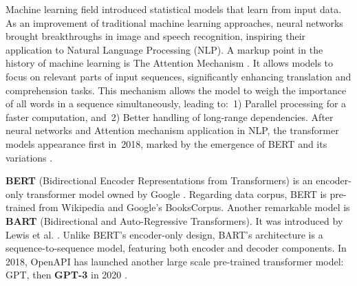 Machine learning field introduced statistical models that learn from input data. As an improvement of traditional machine learning approaches, neural networks brought breakthroughs in image and speech recognition, inspiring their application to Natural Language Processing (NLP). A markup point in the history of machine learning is The Attention Mechanism \cite{10.5555/3295222.3295349}. It allows models to focus on relevant parts of input sequences, significantly enhancing translation and comprehension tasks.
This mechanism allows the model to weigh the importance of all words in a sequence simultaneously, leading to:~1) Parallel processing for a faster computation, and~2) Better handling of long-range dependencies. After neural networks and Attention mechanism application in NLP, the transformer models appearance first in~2018, marked by the emergence of BERT and its variations \cite{DBLP:journals/corr/abs-2302-09419}.


\textbf{BERT} (Bidirectional Encoder Representations from Transformers) is an encoder-only transformer model owned by Google \cite{devlin2019bertpretrainingdeepbidirectional}. Regarding data corpus, BERT is pre-trained from  Wikipedia and Google’s BooksCorpus. Another remarkable model is \textbf{BART} (Bidirectional and Auto-Regressive Transformers). It was introduced by Lewis et al. \cite{lewis2019bartdenoisingsequencetosequencepretraining}.
Unlike BERT’s encoder-only design, BART’s architecture is a sequence-to-sequence model, featuring both encoder and decoder components.
In 2018, OpenAPI has launched another large scale pre-trained transformer model: GPT, then \textbf{GPT-3} in 2020 \cite{10113601}.


 


